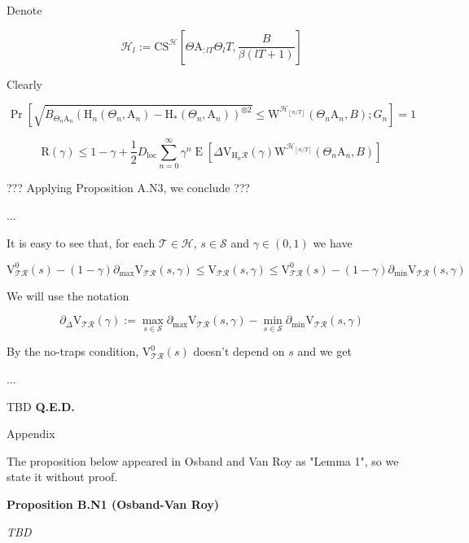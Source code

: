 \documentclass[a4paper]{article}
\newcommand{\Co}[1]{}
\newcommand{\AP}[1]{\left(#1\right)}
\newcommand{\AB}[1]{\left[#1\right]}
\newcommand{\Pa}[2]{\underset{#1}{\operatorname{Pr}}\AB{#2}}
\newcommand{\Ea}[2]{\underset{#1}{\operatorname{E}}\AB{#2}}
\newcommand{\Floor}[1]{\left\lfloor #1 \right\rfloor}
\newcommand{\B}{B}
\newcommand{\St}{\mathcal{S}}
\newcommand{\R}{\mathcal{R}}
\newcommand{\T}{\mathcal{T}}
\newcommand{\Hy}{\mathcal{H}}
\newcommand{\DL}{D_{\mathrm{loc}}}
\newcommand{\V}{\mathrm{V}}
\newcommand{\Reg}{\mathrm{R}}
\newcommand{\CS}{\mathrm{CS}}
\newcommand{\W}{\mathrm{W}}
\newcommand{\AT}{\mathrm{A}}
\newcommand{\THy}{\mathrm{H}_*}
\newcommand{\SHy}{\mathrm{H}}
\newcommand{\CSE}{G}
\begin{document}
Denote

$$\Hy_l:=\CS^\Hy\AB{\Theta\AT_{:lT}\Theta_lT,\frac{\B }{\beta(lT+1)}}$$

Clearly

$$\Pa{}{\sqrt{B_{\Theta_n\AT_n}\AP{\SHy_n\AP{\Theta_n,\AT_n}-\THy\AP{\Theta_n,\AT_n}}^{\otimes2}}\leq\W^{\Hy_{\Floor{n/T}}}\AP{\Theta_n\AT_n,B};\CSE_n}=1$$

$$\Reg(\gamma)\leq1-\gamma+\frac{1}{2}\DL\sum_{n=0}^\infty\gamma^{n}\Ea{}{\Delta\V_{\SHy_n\R}(\gamma)\W^{\Hy_{\Floor{n/T}}}\AP{\Theta_n\AT_n,B} }$$


??? Applying Proposition A.N3, we conclude ???

...

It is easy to see that, for each $\T\in\Hy$, $s\in\St$ and $\gamma\in(0,1)$ we have

$$\V^0_{\T\R}\AP{s}-(1-\gamma)\partial_{\max}\V_{\T\R}(s,\gamma)\leq\V_{\T\R}(s,\gamma)\leq\V^0_{\T\R}\AP{s}-(1-\gamma)\partial_{\min}\V_{\T\R}(s,\gamma)$$

We will use the notation 

$$\partial_{\Delta}\V_{\T\R}(\gamma):=\max_{s\in\St}{\partial_{\max}\V_{\T\R}(s,\gamma)}-\min_{s\in\St}{\partial_{\min}\V_{\T\R}(s,\gamma)}$$

By the no-traps condition, $\V^0_{\T\R}(s)$ doesn't depend on $s$ and we get

...
 

TBD \textbf{Q.E.D.}\Co{b}

\begin{Huge}Appendix\end{Huge}

The proposition below appeared in Osband and Van Roy as "Lemma 1", so we state it without proof.

\textbf{Proposition B.N1 (Osband-Van Roy)}\Co{b}

\textit{TBD}\Co{i}
\end{document}
